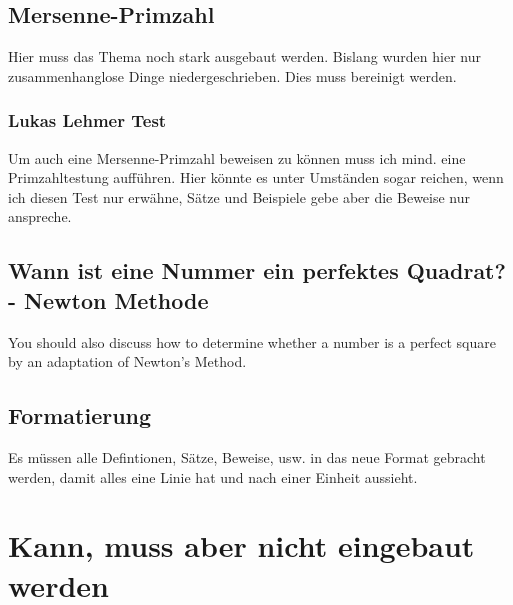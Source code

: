 \documentclass[12pt,a4paper]{article}
\theoremstyle{definition}
\begin{document}
\subsection{Mersenne-Primzahl}
Hier muss das Thema noch stark ausgebaut werden. Bislang wurden hier nur zusammenhanglose Dinge niedergeschrieben. Dies muss bereinigt werden.
\subsubsection{Lukas Lehmer Test}
Um auch eine Mersenne-Primzahl beweisen zu können muss ich mind. eine Primzahltestung aufführen. Hier könnte es unter Umständen sogar reichen, wenn ich diesen Test nur erwähne, Sätze und Beispiele gebe aber die Beweise nur anspreche.
\subsection{Wann ist eine Nummer ein perfektes Quadrat? - Newton Methode}
You should also discuss how to determine whether a number is a perfect square by an adaptation of Newton's Method.
\subsection{Formatierung}
Es müssen alle Defintionen, Sätze, Beweise, usw. in das neue Format gebracht werden, damit alles eine Linie hat und nach einer Einheit aussieht.
\newpage

\section{Kann, muss aber nicht eingebaut werden}
\end{document}
